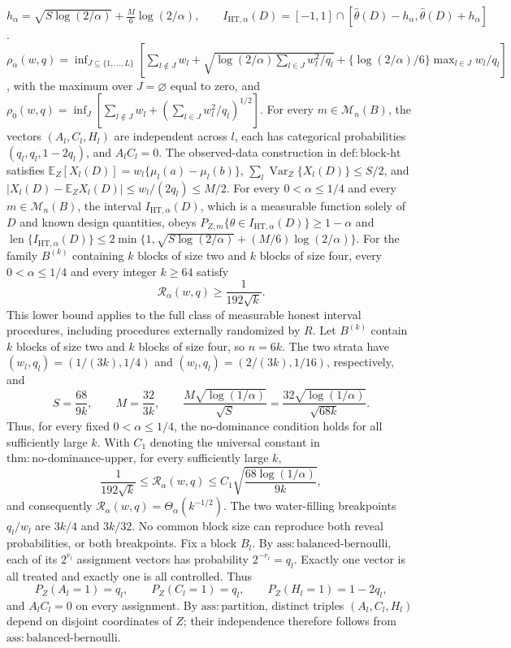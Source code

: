 \(h_\alpha=\sqrt{S\log(2/\alpha)}+\frac{M}{6}\log(2/\alpha),\qquad I_{\mathrm{HT},\alpha}(D)=[-1,1]\cap[\widehat\theta(D)-h_\alpha,\widehat\theta(D)+h_\alpha]\).
\(\rho_\alpha(w,q)=\inf_{J\subseteq\{1,\ldots,L\}}[\sum_{l\notin J}w_l+\sqrt{\log(2/\alpha)\sum_{l\in J}w_l^2/q_l}+\{\log(2/\alpha)/6\}\max_{l\in J}w_l/q_l]\), with the maximum over \(J=\varnothing\) equal to zero, and \(\rho_0(w,q)=\inf_J[\sum_{l\notin J}w_l+(\sum_{l\in J}w_l^2/q_l)^{1/2}]\).
For every \(m\in\mathcal M_n(B)\), the vectors \((A_l,C_l,H_l)\) are independent across \(l\), each has categorical probabilities \((q_l,q_l,1-2q_l)\), and \(A_lC_l=0\). The observed-data construction in \(\mathrm{def{:}block\text{-}ht}\) satisfies \(\mathbb E_Z[X_l(D)]=w_l\{\mu_l(a)-\mu_l(b)\}\), \(\sum_l\operatorname{Var}_Z\{X_l(D)\}\le S/2\), and \(|X_l(D)-\mathbb E_ZX_l(D)|\le w_l/(2q_l)\le M/2\).
For every \(0<\alpha\le1/4\) and every \(m\in\mathcal M_n(B)\), the interval \(I_{\mathrm{HT},\alpha}(D)\), which is a measurable function solely of \(D\) and known design quantities, obeys \(P_{Z,m}\{\theta\in I_{\mathrm{HT},\alpha}(D)\}\ge1-\alpha\) and \(\operatorname{len}\{I_{\mathrm{HT},\alpha}(D)\}\le2\min\{1,\sqrt{S\log(2/\alpha)}+(M/6)\log(2/\alpha)\}\).
For the family \(B^{(k)}\) containing \(k\) blocks of size two and \(k\) blocks of size four, every \(0<\alpha\le 1/4\) and every integer \(k\ge64\) satisfy
\[
 \mathcal R_\alpha(w,q)\ge \frac{1}{192\sqrt{k}}.
\]
This lower bound applies to the full class of measurable honest interval procedures, including procedures externally randomized by \(R\).
Let \(B^{(k)}\) contain \(k\) blocks of size two and \(k\) blocks of
size four, so \(n=6k\).  The two strata have
\((w_l,q_l)=(1/(3k),1/4)\) and
\((w_l,q_l)=(2/(3k),1/16)\), respectively, and
\[
 S=\frac{68}{9k},\qquad M=\frac{32}{3k},\qquad
 \frac{M\sqrt{\log(1/\alpha)}}{\sqrt S}
 =\frac{32\sqrt{\log(1/\alpha)}}{\sqrt{68k}}.
\]
Thus, for every fixed \(0<\alpha\le1/4\), the no-dominance condition
holds for all sufficiently large \(k\).  With \(C_1\) denoting the
universal constant in
\(\mathrm{thm{:}no\text{-}dominance\text{-}upper}\), for every
sufficiently large \(k\),
\[
 \frac{1}{192\sqrt{k}}
 \le \mathcal R_\alpha(w,q)
 \le C_1\sqrt{\frac{68\log(1/\alpha)}{9k}},
\]
and consequently \(\mathcal R_\alpha(w,q)=\Theta_\alpha(k^{-1/2})\).
The two water-filling breakpoints \(q_l/w_l\) are \(3k/4\) and
\(3k/32\).  No common block size can reproduce both reveal
probabilities, or both breakpoints.
Fix a block \(B_l\).  By
\(\mathrm{ass{:}balanced\text{-}bernoulli}\), each of its
\(2^{r_l}\) assignment vectors has probability \(2^{-r_l}=q_l\).
Exactly one vector is all treated and exactly one is all controlled.
Thus
\[
 P_Z(A_l=1)=q_l,\qquad P_Z(C_l=1)=q_l,
 \qquad P_Z(H_l=1)=1-2q_l,
\tag{1}
\]
and \(A_lC_l=0\) on every assignment.  By
\(\mathrm{ass{:}partition}\), distinct triples
\((A_l,C_l,H_l)\) depend on disjoint coordinates of \(Z\); their
independence therefore follows from
\(\mathrm{ass{:}balanced\text{-}bernoulli}\).

